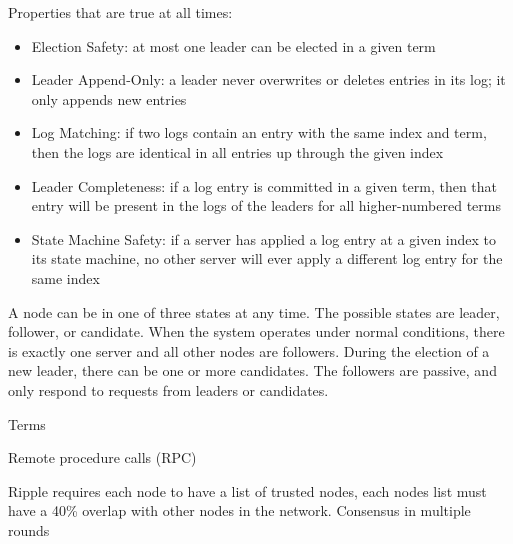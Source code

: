 Properties that are true at all times: %
\begin{itemize}
\item Election Safety: at most one leader can be elected in a given term
\item Leader Append-Only: a leader never overwrites or deletes entries in its log; it only appends new entries
\item Log Matching: if two logs contain an entry with the same index and term, then the logs are identical in all entries up through the given index
\item Leader Completeness: if a log entry is committed in a given term, then that entry will be present in the logs of the leaders for all higher-numbered terms
\item State Machine Safety: if a server has applied a log entry at a given index to its state machine, no other server will ever apply a different log entry for the same index
\end{itemize}

A node can be in one of three states at any time. The possible states are leader, follower, or candidate. 
When the system operates under normal conditions, there is exactly one server and all other nodes are followers. During the election of a new leader, there can be one or more candidates. The followers are passive, and only respond to requests from leaders or candidates. 

Terms

Remote procedure calls (RPC)











Ripple requires each node to have a list of trusted nodes, each nodes list must have a 40\% overlap with other nodes in the network. Consensus in multiple rounds

